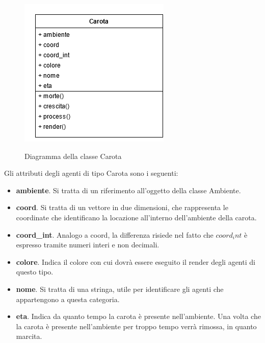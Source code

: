 \documentclass[11pt]{article}
\begin{document}
\begin{figure}[h!]
     \centering
     \includegraphics[scale = 0.7]{Carota.png}
     \label{fig:carotaUML}
     \caption{Diagramma della classe Carota}
\end{figure}
 Gli attributi degli agenti di tipo Carota sono i seguenti: 
\begin{itemize}
    \item \textbf{ambiente}. Si tratta di un riferimento all'oggetto della classe Ambiente. 
    \item \textbf{coord}. Si tratta di un vettore in due dimensioni, che rappresenta le coordinate che identificano la locazione all'interno dell'ambiente della carota. 
    \item \textbf{coord\_int}. Analogo a coord, la differenza risiede nel fatto che $coord_int$ è espresso tramite numeri interi e non decimali. 
    \item \textbf{colore}. Indica il colore con cui dovrà essere eseguito il render degli agenti di questo tipo.
    \item \textbf{nome}. Si tratta di una stringa, utile per identificare gli agenti che appartengono a questa categoria. 
    \item \textbf{eta}. Indica da quanto tempo la carota è presente nell'ambiente. Una volta che la carota è presente nell'ambiente per troppo tempo verrà rimossa, in quanto marcita. 
\end{itemize}
\end{document}
